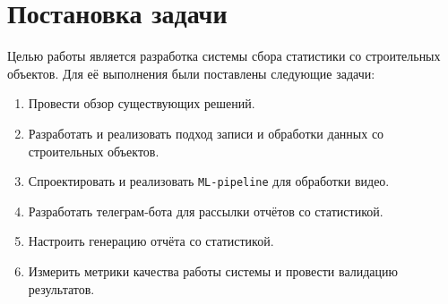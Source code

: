 
\section{Постановка задачи}
\label{sec:task}

Целью работы является разработка системы сбора статистики со строительных объектов.
Для её выполнения были поставлены следующие задачи:

\begin{enumerate}
    \item Провести обзор существующих решений.
    \item Разработать и реализовать подход записи и обработки данных со строительных объектов.
    \item Спроектировать и реализовать \texttt{ML-pipeline} для обработки видео.
    \item Разработать телеграм-бота для рассылки отчётов со статистикой.
    \item Настроить генерацию отчёта со статистикой.
    \item Измерить метрики качества работы системы и провести валидацию результатов.
\end{enumerate}
